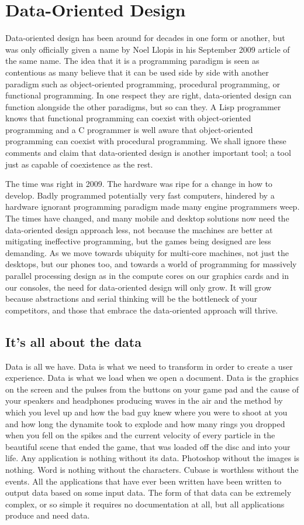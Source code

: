 \chapter{Data-Oriented Design}

Data-oriented design has been around for decades in one form or another, but
was only officially given a name by Noel Llopis in his September 2009 article
of the same name. The idea that it is a programming paradigm is seen as
contentious as many believe that it can be used side by side with another
paradigm such as object-oriented programming, procedural programming, or
functional programming. In one respect they are right, data-oriented design can
function alongside the other paradigms, but so can they. A Lisp programmer
knows that functional programming can coexist with object-oriented programming
and a C programmer is well aware that object-oriented programming can coexist
with procedural programming. We shall ignore these comments and claim that
data-oriented design is another important tool; a tool just as capable of
coexistence as the rest.

The time was right in 2009. The hardware was ripe for a change in how to
develop.  Badly programmed potentially very fast computers, hindered by a
hardware ignorant programming paradigm made many engine programmers weep. The
times have changed, and many mobile and desktop solutions now need the
data-oriented design approach less, not because the machines are better at
mitigating ineffective programming, but the games being designed are less
demanding. As we move towards ubiquity for multi-core machines, not just the
desktops, but our phones too, and towards a world of programming for massively
parallel processing design as in the compute cores on our graphics cards and in
our consoles, the need for data-oriented design will only grow. It will grow
because abstractions and serial thinking will be the bottleneck of your
competitors, and those that embrace the data-oriented approach will thrive.

\section{It's all about the data}

Data is all we have. Data is what we need to transform in order to create a
user experience. Data is what we load when we open a document. Data is the
graphics on the screen and the pulses from the buttons on your game pad and the
cause of your speakers and headphones producing waves in the air and the method
by which you level up and how the bad guy knew where you were to shoot at you
and how long the dynamite took to explode and how many rings you dropped when
you fell on the spikes and the current velocity of every particle in the
beautiful scene that ended the game, that was loaded off the disc and into your
life. Any application is nothing without its data. Photoshop without the images
is nothing. Word is nothing without the characters. Cubase is worthless without
the events.  All the applications that have ever been written have been written
to output data based on some input data. The form of that data can be extremely
complex, or so simple it requires no documentation at all, but all applications
produce and need data.

